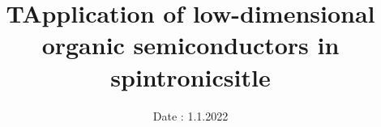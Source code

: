 

\subject{\vspace{-4cm}Semiconductor materials and nanostructures}  %
\title{\vspace{-0.5cm}TApplication of low-dimensional organic semiconductors in spintronicsitle} %
\date{\vspace{-0.5cm}
 Date : 1.1.2022  %
}




\twocolumn[
\maketitle
\begin{onecolabstract}
  
\end{onecolabstract}
]


% 
% 


\printbibliography{}


